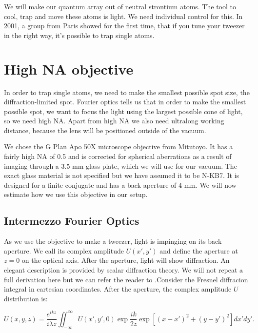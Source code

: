 We will make our quantum array out of neutral strontium atoms. The tool to cool, trap and move these atoms is light. We need individual control for this. In 2001, a group from Paris showed for the first time, that if you tune your tweezer in the right way, it's possible to trap single atoms.         


 
\section{High NA objective}

In order to trap single atoms, we need to make the smallest possible spot size, the diffraction-limited spot. Fourier optics tells us that in order to make the smallest possible spot, we want to focus the light using the largest possible cone of light, so we need high NA. Apart from high NA we also need ultralong working distance, because the lens will be positioned outside of the vacuum. 

We chose the G Plan Apo 50X microscope objective from Mitutoyo. It has a fairly high NA of 0.5 and is corrected for spherical aberrations as a result of imaging through a 3.5 mm glass plate, which we will use for our vacuum. The exact glass material is not specified but we have assumed it to be N-KB7. It is designed for a finite conjugate and has a back aperture of 4 mm. We will now estimate how we use this objective in our setup. 

\subsection{Intermezzo Fourier Optics}

As we use the objective to make a tweezer, light is impinging on its back aperture. We call its complex amplitude $U(x',y')$ and define the aperture at $z = 0$ on the optical axis. After the aperture, light will show diffraction. An elegant description is provided by scalar diffraction theory. We will not repeat a full derivation here but we can refer the reader to \cite{Goodman2005}.Consider the Fresnel diffracion integral in cartesian coordinates. After the aperture, the complex amplitude $U$ distribution is:

\begin{equation}\label{FresnelDiffraction}
    U(x,y,z) = 
    \frac{e^{ikz}}{i \lambda z} \iint_{-\infty}^{\infty} U(x',y',0) \exp{\frac{ik}{2z}} \exp{\left[(x-x')^2+(y-y')^2\right]} dx'dy'.
\end{equation}

